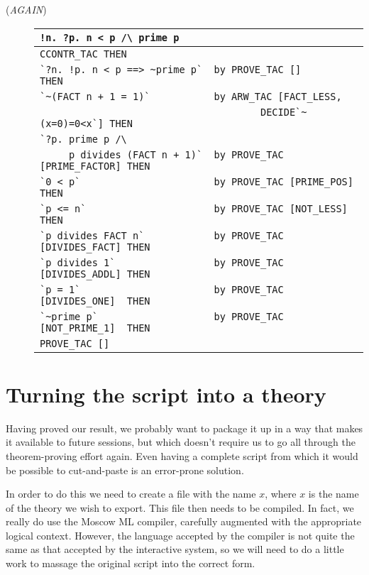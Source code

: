 \begin{description}
\item [\small{({\it AGAIN\/})}]
\begin{tabular}[t]{l}
\verb+!n. ?p. n < p /\ prime p+ \\ \hline
\verb|CCONTR_TAC THEN | \\
\verb|`?n. !p. n < p ==> ~prime p`  by PROVE_TAC []             THEN| \\
\verb|`~(FACT n + 1 = 1)`           by ARW_TAC [FACT_LESS,| \\
\verb|                                      DECIDE`~(x=0)=0<x`] THEN| \\
\verb|`?p. prime p /\  | \\
\verb|     p divides (FACT n + 1)`  by PROVE_TAC [PRIME_FACTOR] THEN| \\
\verb|`0 < p`                       by PROVE_TAC [PRIME_POS]    THEN| \\
\verb|`p <= n`                      by PROVE_TAC [NOT_LESS]     THEN| \\
\verb|`p divides FACT n`            by PROVE_TAC [DIVIDES_FACT] THEN| \\
\verb|`p divides 1`                 by PROVE_TAC [DIVIDES_ADDL] THEN| \\
\verb|`p = 1`                       by PROVE_TAC [DIVIDES_ONE]  THEN| \\
\verb|`~prime p`                    by PROVE_TAC [NOT_PRIME_1]  THEN| \\
\verb|PROVE_TAC []| \\
\end{tabular}
\end{description}

\section{Turning the script into a theory}
\label{sec:script-to-theory}

Having proved our result, we probably want to package it up in a way
that makes it available to future sessions, but which doesn't require
us to go all through the theorem-proving effort again.  Even having a
complete script from which it would be possible to cut-and-paste is an
error-prone solution.

In order to do this we need to create a file with the name
$x$, where $x$ is the name of the theory we wish to
export.  This file then needs to be compiled.  In fact, we really do
use the Moscow ML compiler, carefully augmented with the appropriate
logical context.  However, the language accepted by the compiler is
not quite the same as that accepted by the interactive system, so we
will need to do a little work to massage the original script into the
correct form.

